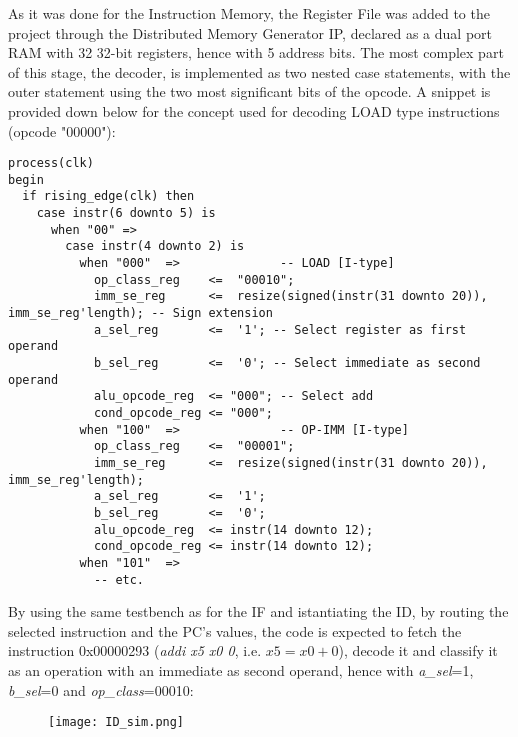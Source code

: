 As it was done for the Instruction Memory, the Register File was added to the project through the Distributed Memory Generator IP, declared as a dual port RAM with 32 32-bit registers, hence with 5 address bits. The most complex part of this stage, the decoder, is implemented as two nested case statements, with the outer statement using the two most significant bits of the opcode. A snippet is provided down below for the concept used for decoding LOAD type instructions (opcode "00000"):

\begin{verbatim}
process(clk)
begin
  if rising_edge(clk) then
    case instr(6 downto 5) is
      when "00" =>
        case instr(4 downto 2) is 
          when "000"  =>              -- LOAD [I-type]
            op_class_reg    <=  "00010";
            imm_se_reg      <=  resize(signed(instr(31 downto 20)), imm_se_reg'length); -- Sign extension 
            a_sel_reg       <=  '1'; -- Select register as first operand 
            b_sel_reg       <=  '0'; -- Select immediate as second operand
            alu_opcode_reg  <= "000"; -- Select add
            cond_opcode_reg <= "000";
          when "100"  =>              -- OP-IMM [I-type]
            op_class_reg    <=  "00001";
            imm_se_reg      <=  resize(signed(instr(31 downto 20)), imm_se_reg'length);
            a_sel_reg       <=  '1';
            b_sel_reg       <=  '0';
            alu_opcode_reg  <= instr(14 downto 12);
            cond_opcode_reg <= instr(14 downto 12);    
          when "101"  => 
            -- etc.
\end{verbatim}

By using the same testbench as for the IF and istantiating the ID, by routing the selected instruction and the PC's values, the code is expected to fetch the instruction 0x00000293 (\emph{addi x5 x0 0}, i.e. $x5 = x0 + 0$), decode it and classify it as an operation with an immediate as second operand, hence with \emph{a{\_}sel}=1, \emph{b{\_}sel}=0 and \emph{op{\_}class}=00010:

\begin{figure}[h!]
  \centering
  \texttt{[image: ID\_sim.png]}
\end{figure}


\let\cleardoublepage\clearpage